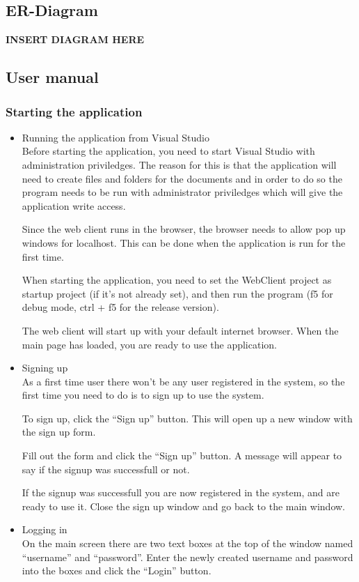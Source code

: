 \documentclass[11pt]{article}
\begin{document}
\subsection{ER-Diagram}
\label{sec-3-4}

   \textbf{INSERT DIAGRAM HERE}
\subsection{User manual}
\label{sec-3-5}
\subsubsection{Starting the application}
\label{sec-3-5-1}
\begin{itemize}

\item Running the application from Visual Studio\\
\label{sec-3-5-1-1}%
Before starting the application, you need to start Visual Studio with administration priviledges.
     The reason for this is that the application will need to create files and folders for the documents
     and in order to do so the program needs to be run with administrator priviledges which will give the 
     application write access.

     Since the web client runs in the browser, the browser needs to allow pop up windows for localhost.
     This can be done when the application is run for the first time.

     When starting the application, you need to set the WebClient project as startup project (if it's not
     already set), and then run the program (f5 for debug mode, ctrl + f5 for the release version).

     The web client will start up with your default internet browser. 
     When the main page has loaded, you are ready to use the application.

\item Signing up\\
\label{sec-3-5-1-2}%
As a first time user there won't be any user registered in the system, so the first time you need
     to do is to sign up to use the system.

     To sign up, click the ``Sign up'' button. This will open up a new window with the sign up form.

     Fill out the form and click the ``Sign up'' button. A message will appear to say if the signup
     was successfull or not.

     If the signup was successfull you are now registered in the system, and are ready to use it. 
     Close the sign up window and go back to the main window.

\item Logging in\\
\label{sec-3-5-1-3}%
On the main screen there are two text boxes at the top of the window named ``username'' and ``password''.
     Enter the newly created username and password into the boxes and click the ``Login'' button.
\end{itemize} %
\end{document}
